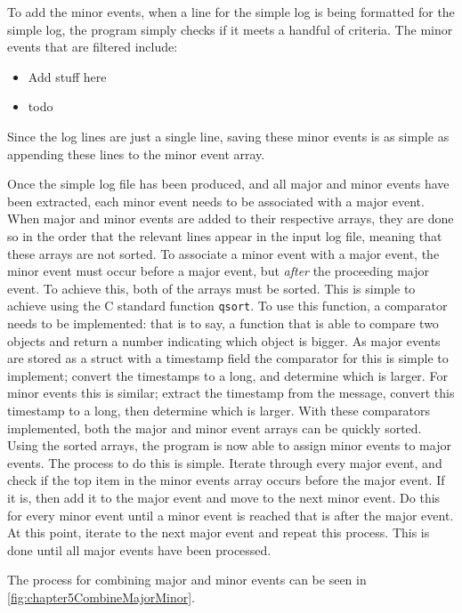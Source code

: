 To add the minor events, when a line for the simple log is being formatted for the simple log, the program simply checks if it meets a handful of criteria.
The minor events that are filtered include:
\begin{itemize}
    \item Add stuff here
    \item todo
\end{itemize}
Since the log lines are just a single line, saving these minor events is as simple as appending these lines to the minor event array.


Once the simple log file has been produced, and all major and minor events have been extracted, each minor event needs to be associated with a major event.
When major and minor events are added to their respective arrays, they are done so in the order that the relevant lines appear in the input log file, meaning that these arrays are not sorted.
To associate a minor event with a major event, the minor event must occur before a major event, but \emph{after} the proceeding major event.
To achieve this, both of the arrays must be sorted.
This is simple to achieve using the C standard function \verb|qsort|.
To use this function, a comparator needs to be implemented: that is to say, a function that is able to compare two objects and return a number indicating which object is bigger.
As major events are stored as a struct with a timestamp field the comparator for this is simple to implement; convert the timestamps to a long, and determine which is larger.
For minor events this is similar; extract the timestamp from the message, convert this timestamp to a long, then determine which is larger.
With these comparators implemented, both the major and minor event arrays can be quickly sorted.
Using the sorted arrays, the program is now able to assign minor events to major events.
The process to do this is simple. Iterate through every major event, and check if the top item in the minor events array occurs before the major event.
If it is, then add it to the major event and move to the next minor event. 
Do this for every minor event until a minor event is reached that is after the major event.
At this point, iterate to the next major event and repeat this process.
This is done until all major events have been processed.

The process for combining major and minor events can be seen in \figurename{ \ref{fig:chapter5CombineMajorMinor}}.

